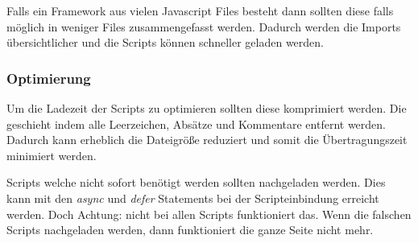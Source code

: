 Falls ein Framework aus vielen Javascript Files besteht dann sollten diese falls möglich in weniger Files zusammengefasst werden. Dadurch werden die Imports übersichtlicher und die Scripts können schneller geladen werden.

\subsubsection{Optimierung}
Um die Ladezeit der Scripts zu optimieren sollten diese komprimiert werden. Die geschieht indem alle Leerzeichen, Absätze und Kommentare entfernt werden. Dadurch kann erheblich die Dateigröße reduziert und somit die Übertragungszeit minimiert werden. 

Scripts welche nicht sofort benötigt werden sollten nachgeladen werden. Dies kann mit den \textit{async} und \textit{defer} Statements bei der Scripteinbindung erreicht werden. Doch Achtung: nicht bei allen Scripts funktioniert das. Wenn die falschen Scripts nachgeladen werden, dann funktioniert die ganze Seite nicht mehr.